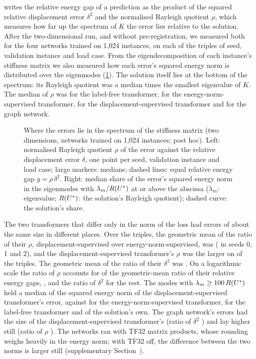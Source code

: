  writes the relative energy gap of a prediction as the product of the
squared relative displacement error $\delta^2$ and the normalised Rayleigh quotient $\rho$,
which measures how far up the spectrum of $K$ the error lies relative to the solution. After
the two-dimensional run, and without pre-registration, we measured both for the four networks trained on 1,024 instances, on each of the
\numSpecLoads{} triples of seed, validation instance and load case. From the
eigendecomposition of each instance's stiffness matrix we also measured how each error's squared energy norm is distributed over the eigenmodes
(\cref{fig:spectra}). The solution itself lies at the bottom of the spectrum: its Rayleigh
quotient was a median \numSpecRqStarOverMin{} times the smallest eigenvalue of $K$. The
median of $\rho$ was \numSpecRqFree{} for the label-free transformer, \numSpecRqKnorm{} for
the energy-norm-supervised transformer, \numSpecRqLab{} for the displacement-supervised
transformer and \numSpecRqMgn{} for the graph network.

\begin{figure}[tbp]
\centering
{}
\caption{Where the errors lie in the spectrum of the stiffness matrix (two dimensions,
networks trained on 1,024 instances; post hoc). Left: normalised Rayleigh quotient $\rho$ of
the error against the relative displacement error $\delta$, one point per seed, validation
instance and load case; large markers: medians; dashed lines: equal relative energy gap
$g=\rho\,\delta^2$. Right: median share of the error's squared energy norm in the
eigenmodes with $\lambda_m/R(U^{\ast})$ at or above the abscissa ($\lambda_m$: eigenvalue;
$R(U^{\ast})$: the solution's Rayleigh quotient); dashed curve: the solution's share.}
\label{fig:spectra}
\end{figure}

The two transformers that differ only in the norm of the loss had errors of about the same
size in different places. Over the triples, the geometric mean of the ratio of their $\rho$,
displacement-supervised over energy-norm-supervised, was \numSpecLabKnormRq{}
(\numSpecLabKnormRqSeeds{} in seeds 0, 1 and 2), and the displacement-supervised
transformer's $\rho$ was the larger on \numSpecLabKnormAbove{} of the triples. The geometric mean of the ratio of their $\delta^2$ was \numSpecLabKnormDisp{}. On a logarithmic scale the
ratio of $\rho$ accounts for \numSpecSpectralShare{} of the geometric-mean ratio of their
relative energy gaps, \numSpecLabKnormGap{}, and the ratio of $\delta^2$ for the rest. The
modes with $\lambda_m\ge 100\,R(U^{\ast})$ held a median \numSpecShareKLab{} of the squared
energy norm of the displacement-supervised transformer's error, against
\numSpecShareKKnorm{} for the energy-norm-supervised transformer, \numSpecShareKFree{} for
the label-free transformer and \numSpecShareKStar{} of the solution's own. The graph
network's errors had the size of the displacement-supervised transformer's (ratio of
$\delta^2$ \numSpecMgnLabDisp{}) and lay higher still (ratio of $\rho$ \numSpecMgnLabRq{}).
The networks ran with TF32 matrix products, whose rounding weighs heavily in the energy
norm; with TF32 off, the difference between the two norms is larger still (supplementary
Section~\SuppRepro{}).

